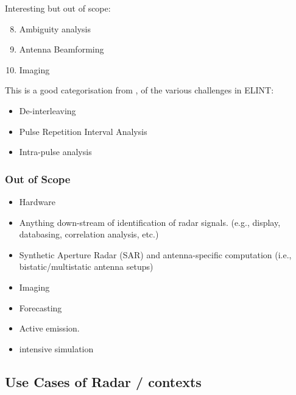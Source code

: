 Interesting but out of scope:
\begin{enumerate}
  \setcounter{enumi}{7}
    \item Ambiguity analysis
    \item Antenna Beamforming
    \item Imaging
\end{enumerate}

This is a good categorisation from \cite{wiley_elint_2006}, of the various challenges in ELINT:

\begin{itemize}
    \item De-interleaving
    \item Pulse Repetition Interval Analysis
    \item Intra-pulse analysis
\end{itemize}

\subsubsection{Out of Scope}

\begin{itemize}
    \item Hardware
    \item Anything down-stream of identification of radar signals. (e.g., display, databasing, correlation analysis, etc.)
    \item Synthetic Aperture Radar (SAR) and antenna-specific computation (i.e., bistatic/multistatic antenna setups)
    \item Imaging
    \item Forecasting
    \item Active emission.
    \item intensive simulation
\end{itemize}

\subsection{Use Cases of Radar / contexts}

